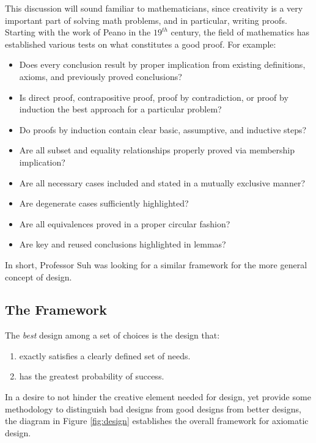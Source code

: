 This discussion will sound familiar to mathematicians, since creativity is a very important part of solving math
problems, and in particular, writing proofs.  Starting with the work of Peano in the \(19^{th}\) century, the field
of mathematics has established various tests on what constitutes a good proof.  For example:
\begin{itemize}
\item Does every conclusion result by proper implication from existing definitions, axioms, and previously proved
  conclusions?
\item Is direct proof, contrapositive proof, proof by contradiction, or proof by induction the best approach for a
  particular problem?
\item Do proofs by induction contain clear basic, assumptive, and inductive steps?
\item Are all subset and equality relationships properly proved via membership implication?
\item Are all necessary cases included and stated in a mutually exclusive manner?
\item Are degenerate cases sufficiently highlighted?
\item Are all equivalences proved in a proper circular fashion?
\item Are key and reused conclusions highlighted in lemmas?
\end{itemize}
In short, Professor Suh was looking for a similar framework for the more general concept of design.

\subsection{The Framework}

The \emph{best} design among a set of choices is the design that:
\begin{enumerate}
\item exactly satisfies a clearly defined set of needs.
\item has the greatest probability of success.
\end{enumerate}

In a desire to not hinder the creative element needed for design, yet provide some methodology to distinguish bad
designs from good designs from better designs, the diagram in Figure \ref{fig:design} establishes the overall
framework for axiomatic design.

